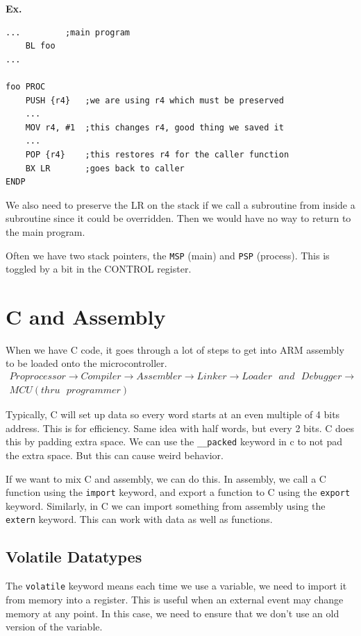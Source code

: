 \documentclass[12pt,letterpaper]{article} \usepackage{amsmath} \usepackage{graphicx} \usepackage[margin=1in]{geometry} \usepackage{longtable}  \usepackage{amssymb}
\begin{document}
	\begin{mdframed}
		\textbf{Ex.}
		\begin{lstlisting}
...			;main program
	BL foo
...

foo PROC
	PUSH {r4}	;we are using r4 which must be preserved
	...
	MOV r4, #1	;this changes r4, good thing we saved it
	...
	POP {r4}	;this restores r4 for the caller function
	BX LR		;goes back to caller
ENDP
		\end{lstlisting}
	\end{mdframed}
	
	We also need to preserve the LR on the stack if we call a subroutine from inside a subroutine since it could be overridden. Then we would have no way to return to the main program.
	
	Often we have two stack pointers, the \verb*|MSP| (main) and \verb*|PSP| (process). This is toggled by a bit in the CONTROL register. 
	
	\section{C and Assembly}
	When we have C code, it goes through a lot of steps to get into ARM assembly to be loaded onto the microcontroller.
	\begin{align*}
		Proprocessor \to Compiler \to Assembler \to Linker \to Loader \text{ }and\text{ } Debugger \to \\MCU (thru \text{ }programmer)
	\end{align*}
	
	Typically, C will set up data so every word starts at an even multiple of 4 bits address. This is for efficiency. Same idea with half words, but every 2 bits. C does this by padding extra space. We can use the \verb*|__packed| keyword in c to not pad the extra space. But this can cause weird behavior. 
	
	If we want to mix C and assembly, we can do this. In assembly, we call a C function using the \verb*|import| keyword, and export a function to C using the \verb*|export| keyword. Similarly, in C we can import something from assembly using the \verb*|extern| keyword. This can work with data as well as functions. 
	
	\subsection{Volatile Datatypes}
	The \verb|volatile| keyword means each time we use a variable, we need to import it from memory into a register. This is useful when an external event may change memory at any point. In this case, we need to ensure that we don't use an old version of the variable.
	
\end{document}
